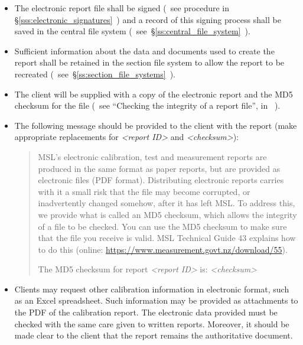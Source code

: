 \begin{itemize}

\item The electronic report file shall be signed (~see procedure in \S\ref{sss:electronic_signatures}~) and a record of this signing process shall be saved in the central file system (~see~\S\ref{ss:central_file_system}~). 

\item Sufficient information about the data and documents used to create the report shall be retained in the section file system to allow the report to be recreated (~see~\S\ref{ss:section_file_systems}~). 
   
\item The client will be supplied with a copy of the electronic report and the MD5 checksum for the file (~see ``Checking the integrity of a report file'', in \cite[\S\ref*{GRP-ss:file_integrity_md5}]{MSL_Reporting_Guidelines}~).

\item The following message should be provided to the client with the report (make appropriate replacements for \textit{<report ID>} and  \textit{<checksum>}):
\begin{quote}
MSL's electronic calibration, test and measurement reports are produced in the same format as paper reports, but are provided as electronic files (PDF format). Distributing electronic reports carries with it a small risk that the file may become corrupted, or inadvertently changed somehow, after it has left MSL. To address this, we provide what is called an MD5 checksum, which allows the integrity of a file to be checked. You can use the MD5 checksum to make sure that the file you receive is valid. MSL Technical Guide 43 explains how to do this (online: \url{https://www.measurement.govt.nz/download/55}).

\vspace{\baselineskip}
The MD5 checksum for report \textit{<report ID>} is:   \textit{<checksum>} 
\end{quote}

\item Clients may request other calibration information in electronic format, such as an Excel spreadsheet. Such information may be provided as attachments to the PDF of the calibration report. The electronic data provided must be checked with the same care given to written reports. Moreover, it should be made clear to the client that the report remains the authoritative document. 

\end{itemize}


